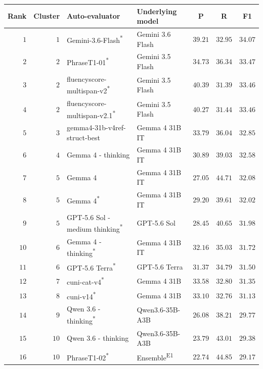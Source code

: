\begin{table}[t]
\centering
\small
\begin{tabular}{rrllrrr}
\toprule
\multicolumn{1}{c}{Rank} & \multicolumn{1}{c}{Cluster} & Auto-evaluator & Underlying model & \multicolumn{1}{c}{P} & \multicolumn{1}{c}{R} & \multicolumn{1}{c}{F1} \\
\midrule
\rowcolor{black!15} $1$ & $1$ & Gemini-3.6-Flash\textsuperscript{*} & Gemini 3.6 Flash & $39.21$ & $32.95$ & $34.07$ \\
$2$ & $2$ & PhraseT1-01\textsuperscript{*} & Gemini 3.5 Flash & $34.73$ & $36.34$ & $33.47$ \\
$3$ & $2$ & fluencyscore-multispan-v2\textsuperscript{*} & Gemini 3.5 Flash & $40.39$ & $31.39$ & $33.46$ \\
$4$ & $2$ & fluencyscore-multispan-v2.1\textsuperscript{*} & Gemini 3.5 Flash & $40.27$ & $31.44$ & $33.46$ \\
$5$ & $3$ & gemma4-31b-v4ref-struct-best & Gemma 4 31B IT & $33.79$ & $36.04$ & $32.85$ \\
\rowcolor{black!15} $6$ & $4$ & Gemma 4 - thinking & Gemma 4 31B IT & $30.89$ & $39.03$ & $32.58$ \\
\rowcolor{black!15} $7$ & $5$ & Gemma 4 & Gemma 4 31B IT & $27.05$ & $44.71$ & $32.08$ \\
\rowcolor{black!15} $8$ & $5$ & Gemma 4\textsuperscript{*} & Gemma 4 31B IT & $29.20$ & $39.61$ & $32.02$ \\
\rowcolor{black!15} $9$ & $5$ & GPT-5.6 Sol - medium thinking\textsuperscript{*} & GPT-5.6 Sol & $28.45$ & $40.65$ & $31.98$ \\
\rowcolor{black!15} $10$ & $6$ & Gemma 4 - thinking\textsuperscript{*} & Gemma 4 31B IT & $32.16$ & $35.03$ & $31.72$ \\
\rowcolor{black!15} $11$ & $6$ & GPT-5.6 Terra\textsuperscript{*} & GPT-5.6 Terra & $31.37$ & $34.79$ & $31.50$ \\
$12$ & $7$ & cuni-cat-v4\textsuperscript{*} & Gemma 4 31B & $33.58$ & $32.80$ & $31.35$ \\
$13$ & $8$ & cuni-v14\textsuperscript{*} & Gemma 4 31B & $33.10$ & $32.76$ & $31.13$ \\
\rowcolor{black!15} $14$ & $9$ & Qwen 3.6 - thinking\textsuperscript{*} & Qwen3.6-35B-A3B & $26.08$ & $38.21$ & $29.77$ \\
\rowcolor{black!15} $15$ & $10$ & Qwen 3.6 - thinking & Qwen3.6-35B-A3B & $23.79$ & $43.01$ & $29.38$ \\
$16$ & $10$ & PhraseT1-02\textsuperscript{*} & Ensemble\textsuperscript{E1} & $22.74$ & $44.85$ & $29.17$ \\

\end{tabular}
\end{table}
